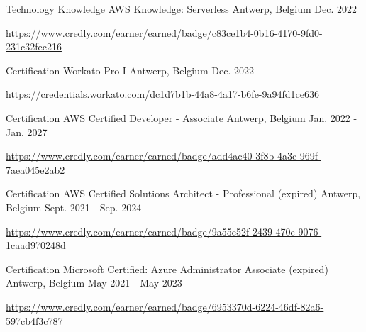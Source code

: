 \begin{cventries}
  \cventry
    {Technology Knowledge} %
    {AWS Knowledge: Serverless} %
    {Antwerp, Belgium} %
    {Dec. 2022} %
    {
      \begin{cvitems} %
        \item \url{https://www.credly.com/earner/earned/badge/c83ce1b4-0b16-4170-9fd0-231c32fec216}
      \end{cvitems}
    }

  \cventry
    {Certification} %
    {Workato Pro I} %
    {Antwerp, Belgium} %
    {Dec. 2022} %
    {
      \begin{cvitems} %
        \item \url{https://credentials.workato.com/dc1d7b1b-44a8-4a17-b6fe-9a94fd1ce636}
      \end{cvitems}
    }

  \cventry
    {Certification} %
    {AWS Certified Developer - Associate} %
    {Antwerp, Belgium} %
    {Jan. 2022 - Jan. 2027} %
    {
      \begin{cvitems} %
        \item \url{https://www.credly.com/earner/earned/badge/add4ac40-3f8b-4a3c-969f-7aea045e2ab2}
      \end{cvitems}
    }


  \cventry
    {Certification} %
    {AWS Certified Solutions Architect - Professional (expired)} %
    {Antwerp, Belgium} %
    {Sept. 2021 - Sep. 2024} %
    {
      \begin{cvitems} %
        \item \url{https://www.credly.com/earner/earned/badge/9a55e52f-2439-470e-9076-1caad970248d}
      \end{cvitems}
    }

  \cventry
    {Certification} %
    {Microsoft Certified: Azure Administrator Associate (expired)} %
    {Antwerp, Belgium} %
    {May 2021 - May 2023} %
    {
      \begin{cvitems} %
        \item \url{https://www.credly.com/earner/earned/badge/6953370d-6224-46df-82a6-597cb4f3c787}
      \end{cvitems}
    }


\end{cventries}
